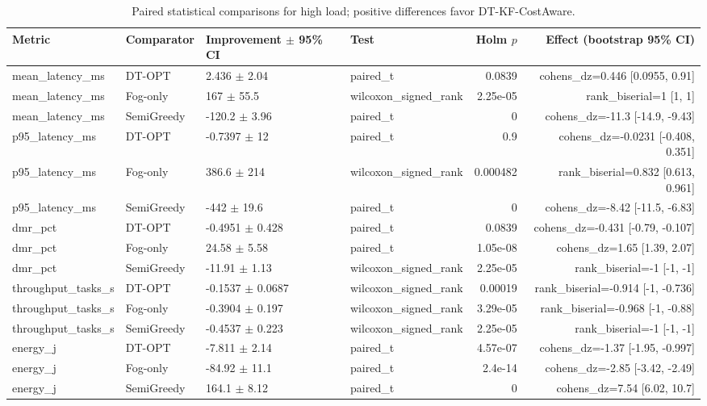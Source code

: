 \begin{table}[t]
\centering
\caption{Paired statistical comparisons for high load; positive differences favor DT-KF-CostAware.}
\label{tab:independent_paired_high}
\scriptsize
\begin{tabular}{llllrr}
\toprule
Metric & Comparator & Improvement $\pm$ 95\% CI & Test & Holm $p$ & Effect (bootstrap 95\% CI) \\
\midrule
mean\_latency\_ms & DT-OPT & 2.436 $\pm$ 2.04 & paired\_t & 0.0839 & cohens\_dz=0.446 [0.0955, 0.91] \\
mean\_latency\_ms & Fog-only & 167 $\pm$ 55.5 & wilcoxon\_signed\_rank & 2.25e-05 & rank\_biserial=1 [1, 1] \\
mean\_latency\_ms & SemiGreedy & -120.2 $\pm$ 3.96 & paired\_t & 0 & cohens\_dz=-11.3 [-14.9, -9.43] \\
p95\_latency\_ms & DT-OPT & -0.7397 $\pm$ 12 & paired\_t & 0.9 & cohens\_dz=-0.0231 [-0.408, 0.351] \\
p95\_latency\_ms & Fog-only & 386.6 $\pm$ 214 & wilcoxon\_signed\_rank & 0.000482 & rank\_biserial=0.832 [0.613, 0.961] \\
p95\_latency\_ms & SemiGreedy & -442 $\pm$ 19.6 & paired\_t & 0 & cohens\_dz=-8.42 [-11.5, -6.83] \\
dmr\_pct & DT-OPT & -0.4951 $\pm$ 0.428 & paired\_t & 0.0839 & cohens\_dz=-0.431 [-0.79, -0.107] \\
dmr\_pct & Fog-only & 24.58 $\pm$ 5.58 & paired\_t & 1.05e-08 & cohens\_dz=1.65 [1.39, 2.07] \\
dmr\_pct & SemiGreedy & -11.91 $\pm$ 1.13 & wilcoxon\_signed\_rank & 2.25e-05 & rank\_biserial=-1 [-1, -1] \\
throughput\_tasks\_s & DT-OPT & -0.1537 $\pm$ 0.0687 & wilcoxon\_signed\_rank & 0.00019 & rank\_biserial=-0.914 [-1, -0.736] \\
throughput\_tasks\_s & Fog-only & -0.3904 $\pm$ 0.197 & wilcoxon\_signed\_rank & 3.29e-05 & rank\_biserial=-0.968 [-1, -0.88] \\
throughput\_tasks\_s & SemiGreedy & -0.4537 $\pm$ 0.223 & wilcoxon\_signed\_rank & 2.25e-05 & rank\_biserial=-1 [-1, -1] \\
energy\_j & DT-OPT & -7.811 $\pm$ 2.14 & paired\_t & 4.57e-07 & cohens\_dz=-1.37 [-1.95, -0.997] \\
energy\_j & Fog-only & -84.92 $\pm$ 11.1 & paired\_t & 2.4e-14 & cohens\_dz=-2.85 [-3.42, -2.49] \\
energy\_j & SemiGreedy & 164.1 $\pm$ 8.12 & paired\_t & 0 & cohens\_dz=7.54 [6.02, 10.7] \\

\end{tabular}
\end{table}
